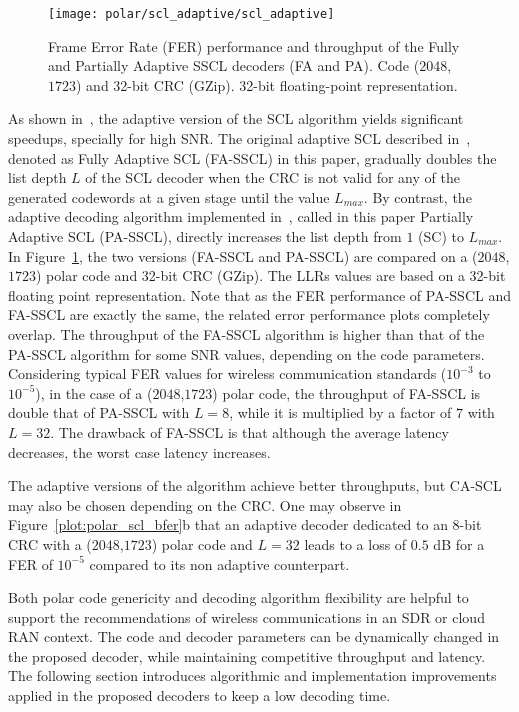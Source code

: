 \begin{figure}
  \centering
  \texttt{[image: polar/scl\_adaptive/scl\_adaptive]}
  \caption{Frame Error Rate (FER) performance and throughput of the Fully and
    Partially Adaptive SSCL decoders (FA and PA). Code ($2048$,$1723$) and
    32-bit CRC (GZip). 32-bit floating-point representation.}
  \label{plot:polar_scl_adaptive}
\end{figure}

As shown in~\cite{Sarkis2016}, the adaptive version of the SCL algorithm yields
significant speedups, specially for high SNR. The original adaptive SCL
described in~\cite{Li2012}, denoted as Fully Adaptive SCL (FA-SSCL) in this
paper, gradually doubles the list depth $L$ of the SCL decoder when the CRC is
not valid for any of the generated codewords at a given stage until the value
$L_{max}$. By contrast, the adaptive decoding algorithm implemented
in~\cite{Sarkis2016}, called in this paper Partially Adaptive SCL (PA-SSCL),
directly increases the list depth from $1$ (SC) to $L_{max}$. In
Figure~\ref{plot:polar_scl_adaptive}, the two versions (FA-SSCL and PA-SSCL) are
compared on a ($2048$,$1723$) polar code and 32-bit CRC (GZip). The LLRs values
are based on a 32-bit floating point representation. Note that as the FER
performance of PA-SSCL and FA-SSCL are exactly the same, the related error
performance plots completely overlap. The throughput of the FA-SSCL algorithm is
higher than that of the PA-SSCL algorithm for some SNR values, depending on the
code parameters. Considering typical FER values for wireless communication
standards ($10^{-3}$ to $10^{-5}$), in the case of a ($2048$,$1723$) polar code,
the throughput of FA-SSCL is double that of PA-SSCL with $L = 8$, while it is
multiplied by a factor of $7$ with $L=32$. The drawback of FA-SSCL is that
although the average latency decreases, the worst case latency increases.

The adaptive versions of the algorithm achieve better throughputs, but CA-SCL
may also be chosen depending on the CRC. One may observe in
Figure~\ref{plot:polar_scl_bfer}b that an adaptive decoder dedicated to an 8-bit
CRC with a ($2048$,$1723$) polar code and $L=32$ leads to a loss of $0.5$ dB for
a FER of $10^{-5}$ compared to its non adaptive counterpart.

Both polar code genericity and decoding algorithm flexibility are helpful to
support the recommendations of wireless communications in an SDR or cloud RAN
context. The code and decoder parameters can be dynamically changed in the
proposed decoder, while maintaining competitive throughput and latency. The
following section introduces algorithmic and implementation improvements applied
in the proposed decoders to keep a low decoding time.

